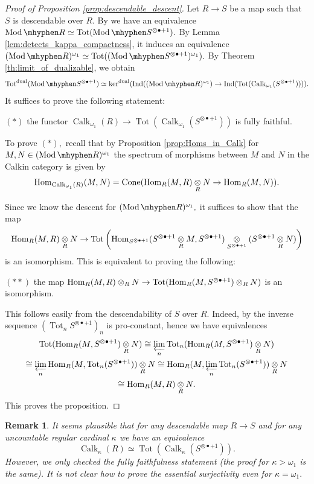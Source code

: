 \documentclass[11pt,leqno]{amsart}
\newtheorem{remark}[theo]{Remark}
\numberwithin{equation}{section}
\def\Hom{\operatorname{Hom}}
\newcommand{\tens}[1]{%
  \mathbin{\mathop{\otimes}\displaylimits_{#1}}%
}
\newcommand{\hy}{\mhyphen}
\newcommand{\prolim}[1][]{\mathop{\varprojlim}\limits_{#1}}
\newcommand{\Cone}{\operatorname{Cone}}
\newcommand{\dual}{\operatorname{dual}}
\newcommand{\Tot}{\operatorname{Tot}}
\newcommand{\Ind}{\operatorname{Ind}}
\newcommand{\Calk}{\operatorname{Calk}}
\newcommand{\Mod}{\operatorname{Mod}}
\begin{document}
\begin{proof}[Proof of Proposition \ref{prop:descendable_descent}] Let $R\to S$ be a map such that $S$ is descendable over $R.$ By \cite[Proposition 3.22]{Mat} we have an equivalence $\Mod\hy R \simeq\Tot(\Mod\hy S^{\otimes\bullet+1}).$ By Lemma \ref{lem:detects_kappa_compactness}, it induces an equivalence $(\Mod\hy R)^{\omega_1}\simeq\Tot((\Mod\hy S^{\otimes\bullet+1})^{\omega_1}).$ By Theorem \ref{th:limit_of_dualizable}, we obtain
$$\Tot^{\dual}(\Mod\hy S^{\otimes\bullet+1})\simeq\ker^{\dual}(\Ind((\Mod\hy R)^{\omega_1})\to \Ind(\Tot(\Calk_{\omega_1}(S^{\otimes\bullet+1})))).$$
It suffices to prove the following statement:

$(*)$ the functor $\Calk_{\omega_1}(R)\to \Tot(\Calk_{\omega_1}(S^{\otimes\bullet +1}))$ is fully faithful.

To prove $(*),$ recall that by Proposition \ref{prop:Homs_in_Calk} for $M,N\in (\Mod\hy R)^{\omega_1}$ the spectrum of morphisms between $M$ and $N$ in the Calkin category is given by
$$\Hom_{\Calk_{\omega_1}(R)}(M,N)=\Cone(\Hom_R(M,R)\tens{R} N\to \Hom_R(M,N)).$$

Since we know the descent for $(\Mod\hy R)^{\omega_1},$ it suffices to show that the map
$$\Hom_R(M,R)\tens{R} N\to\Tot\left(\Hom_{S^{\otimes \bullet+1}}(S^{\otimes\bullet+1}\tens{R} M,S^{\otimes\bullet+1})\tens{S^{\otimes\bullet+1}}(S^{\otimes\bullet+1}\tens{R} N)\right)$$ is an isomorphism. This is equivalent to proving the following:

$(**)$ the map $\Hom_R(M,R)\tens{R} N\to \Tot(\Hom_R(M,S^{\otimes\bullet+1})\tens{R} N)$ is an isomorphism.

This follows easily from the descendability of $S$ over $R.$ Indeed, by \cite[Proposition 3.20]{Mat} the inverse sequence $(\Tot_n S^{\otimes \bullet+1})_n$ is pro-constant, hence we have equivalences
\begin{multline*}\Tot(\Hom_R(M,S^{\otimes\bullet+1})\tens{R}N)\cong \prolim[n] \Tot_n(\Hom_R(M,S^{\otimes\bullet+1})\tens{R}N)\\ \cong
 \prolim[n] \Hom_R(M,\Tot_n(S^{\otimes\bullet+1}))\tens{R}N\cong \Hom_R(M,\prolim[n] \Tot_n(S^{\otimes\bullet+1}))\tens{R}N\\ \cong
  \Hom_R(M,R)\tens{R}N. 
\end{multline*}
This proves the proposition.
\end{proof}

\begin{remark}It seems plausible that for any descendable map $R\to S$ and for any uncountable regular cardinal $\kappa$ we have an equivalence
$$\Calk_{\kappa}(R)\simeq \Tot(\Calk_{\kappa}(S^{\otimes \bullet +1})).$$
However, we only checked the fully faithfulness statement (the proof for $\kappa>\omega_1$ is the same). It is not clear how to prove the essential surjectivity even for $\kappa=\omega_1.$\end{remark}
\end{document}
